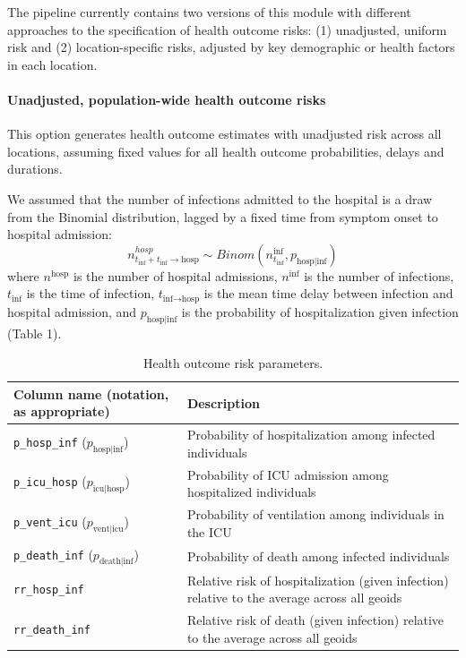 The pipeline currently contains two versions of this module with different approaches to the specification of health outcome risks: (1) unadjusted, uniform risk and (2) location-specific risks, adjusted by key demographic or health factors in each location.

\paragraph{Unadjusted, population-wide health outcome risks}
This option generates health outcome estimates with unadjusted risk across all locations, assuming fixed values for all health outcome probabilities, delays and durations.

We assumed that the number of infections admitted to the hospital is a draw from the Binomial distribution, lagged by a fixed time from symptom onset to hospital admission:
\begin{equation}
n_{t_\text{inf} + t_\text{inf} \to \text{hosp}}^{hosp} \sim Binom\left(n_{t_\text{inf}}^\text{inf}, p_{\text{hosp}| \text{inf}} \right)
\end{equation}
where $n^\text{hosp}$ is the number of hospital admissions, $n^\text{inf}$ is the number of infections, $t_\text{inf}$ is the time of infection, $t_{\text{inf} \to \text{hosp}}$ is the mean time delay between infection and hospital admission, and $p_\text{hosp|inf}$ is the probability of hospitalization given infection (Table 1).

\begin{table}[t]
\caption[Health outcome risk parameters.]{Health outcome risk parameters.}
\label{tab:vdparams}
\centering
\begin{tabular}{ll}
\toprule
 Column name (notation, as appropriate) & Description\\
\midrule
\verb|p_hosp_inf| ($p_{\text{hosp|inf}}$)	& Probability of hospitalization among infected individuals\\
\verb|p_icu_hosp| ($p_{\text{icu|hosp}}$)	&Probability of ICU admission among hospitalized individuals\\
\verb|p_vent_icu| ($p_{\text{vent|icu}}$) &	Probability of ventilation among individuals in the ICU\\
\verb|p_death_inf| ($p_{\text{death|inf}}$)&	Probability of death among infected individuals\\
\verb|rr_hosp_inf|	& Relative risk of hospitalization (given infection) relative to the average across all geoids\\
\verb|rr_death_inf| & Relative risk of death (given infection) relative to the average across all geoids\\
\bottomrule
\end{tabular}
\end{table}

